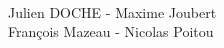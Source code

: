 \begin{center}

  \vspace{80mm}

  \Huge \name\\

  \vspace{50mm}


  \Huge \desc

  \vspace{60mm}

  \Huge Julien DOCHE - Maxime Joubert \\

  François Mazeau - Nicolas Poitou



\end{center}

\newpage

